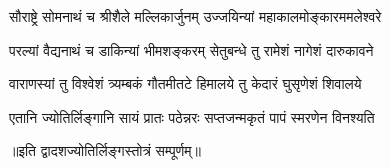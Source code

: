 

\twolineshloka
{सौराष्ट्रे सोमनाथं च श्रीशैले मल्लिकार्जुनम्}
{उज्जयिन्यां महाकालमोङ्कारममलेश्वरे} %

\twolineshloka
{परल्यां वैद्यनाथं च डाकिन्यां भीमशङ्करम्}
{सेतुबन्धे तु रामेशं नागेशं दारुकावने} %

\twolineshloka
{वाराणस्यां तु विश्वेशं त्र्यम्बकं गौतमीतटे}
{हिमालये तु केदारं घुसृणेशं शिवालये} %

\twolineshloka
{एतानि ज्योतिर्लिङ्गानि सायं प्रातः पठेन्नरः}
{सप्तजन्मकृतं पापं स्मरणेन विनश्यति} %

{॥इति द्वादशज्योतिर्लिङ्गस्तोत्रं सम्पूर्णम्॥}
